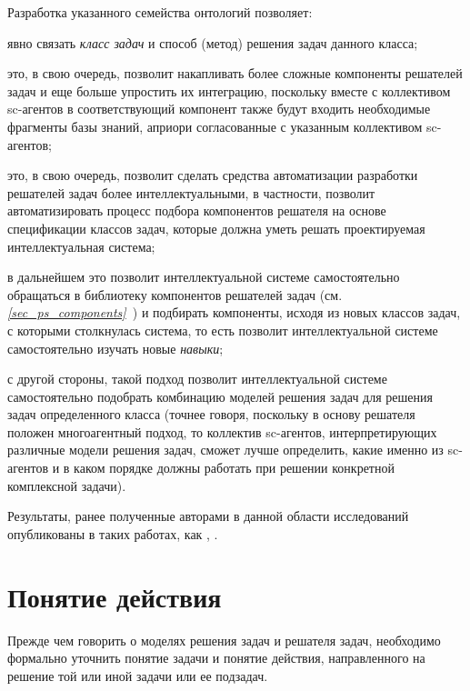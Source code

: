 Разработка указанного семейства онтологий позволяет:
\begin{textitemize}
	\item явно связать \textit{класс задач} и способ (метод) решения задач данного класса;
	\item это, в свою очередь, позволит накапливать более сложные компоненты решателей задач и еще больше упростить их интеграцию, поскольку вместе с коллективом sc-агентов в соответствующий компонент также будут входить необходимые фрагменты базы знаний, априори согласованные с указанным коллективом sc-агентов;
	\item это, в свою очередь, позволит сделать средства автоматизации разработки решателей задач более интеллектуальными, в частности, позволит автоматизировать процесс подбора компонентов решателя на основе спецификации классов задач, которые должна уметь решать проектируемая интеллектуальная система;
	\item в дальнейшем это позволит интеллектуальной системе самостоятельно обращаться в библиотеку компонентов решателей задач (см. \textit{\ref{sec_ps_components}~}) и подбирать компоненты, исходя из новых классов задач, с которыми столкнулась система, то есть позволит интеллектуальной системе самостоятельно изучать новые \textit{навыки};
	\item с другой стороны, такой подход позволит интеллектуальной системе самостоятельно подобрать комбинацию моделей решения задач для решения задач определенного класса (точнее говоря, поскольку в основу решателя положен многоагентный подход, то коллектив sc-агентов, интерпретирующих различные модели решения задач, сможет лучше определить, какие именно из sc-агентов и в каком порядке должны работать при решении конкретной комплексной задачи).
\end{textitemize}

Результаты, ранее полученные авторами в данной области исследований опубликованы в таких работах, как , .

\section{Понятие действия}
\label{sec_action_concept}


Прежде чем говорить о моделях решения задач и решателя задач, необходимо формально уточнить понятие задачи и понятие действия, направленного на решение той или иной задачи или ее подзадач.

